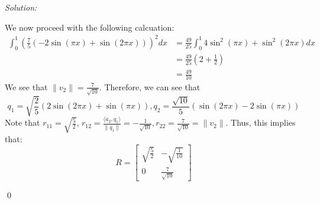 \documentclass[12pt]{article}
\newenvironment{sol}
    {\emph{Solution:}
    }
    {
    \qed
    }
\begin{document}
\begin{sol}
\[    \] 
    We now proceed with the following calcuation:
    \begin{align*}
        \int_{0}^{1} \left( \frac{7}{5} (-2\sin(\pi x) + \sin(2 \pi x)) \right)^2 dx &= \frac{49}{25} \int_{0}^{1} 4\sin^2 (\pi x) + \sin^2(2\pi x) dx \\
        &=  \frac{49}{25} \left( 2 + \frac{1}{2} \right)\\
        &= \frac{49}{10}
    \end{align*}
    We see that $\| v_2\| = \frac{7}{\sqrt{10}}$. Therefore, we can see that 
    \[
    q_1 = \sqrt{\frac{2}{5}} (2\sin (2\pi x) + \sin(\pi x)), q_2 = \frac{\sqrt{10}}{5} \left( \sin(2 \pi x) - 2\sin(\pi x) \right)
    \]
    Note that $r_{11} = \sqrt{\frac{5}{2}}$, $r_{12} = \frac{\langle a_2, q_1 \rangle}{\|q_1\|} = -\frac{1}{\sqrt{10}}, r_{22} = \frac{7}{\sqrt{10}} = \|v_2\|$. Thus, this implies that:
    \[
    R = \begin{bmatrix}
        \sqrt{\frac{5}{2}} & -\sqrt{\frac{1}{10}} \\
        0 & \frac{7}{\sqrt{10}}
    \end{bmatrix}
    \]
\end{sol}
\end{document}
